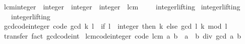 \begin{isabellebody}
%
\endisatagproof
{\isafoldproof}%
%
\isadelimproof
%
\endisadelimproof
\isanewline
\isanewline
{}\isamarkupfalse%
\ lcm{\isacharunderscore}{\kern0pt}integer\ {\isacharcolon}{\kern0pt}{\isacharcolon}{\kern0pt}\ {\isachardoublequoteopen}integer\ {\isasymRightarrow}\ integer\ {\isasymRightarrow}\ integer{\isachardoublequoteclose}\ \ lcm%
\isadelimproof
\ %
\endisadelimproof
%
\isatagproof
\isacommand{{\isachardot}{\kern0pt}}\isamarkupfalse%
%
\endisatagproof
{\isafoldproof}%
%
\isadelimproof
%
\endisadelimproof
\isanewline
\isanewline
{}\isamarkupfalse%
\isanewline
\isanewline
{}\isamarkupfalse%
%
\isadelimproof
\ %
\endisadelimproof
%
\isatagproof
\isacommand{{\isachardot}{\kern0pt}{\isachardot}{\kern0pt}}\isamarkupfalse%
%
\endisatagproof
{\isafoldproof}%
%
\isadelimproof
%
\endisadelimproof
\isanewline
\isanewline
{}\isamarkupfalse%
\isanewline
\isanewline
{}\isamarkupfalse%
\ integer{\isachardot}{\kern0pt}lifting\isanewline
{}\isamarkupfalse%
\ integer{\isachardot}{\kern0pt}lifting\isanewline
\isanewline
{}\isamarkupfalse%
\isanewline
\ \ \ integer{\isachardot}{\kern0pt}lifting\isanewline
{}\isanewline
\isanewline
{}\isamarkupfalse%
\ gcd{\isacharunderscore}{\kern0pt}code{\isacharunderscore}{\kern0pt}integer\ {\isacharbrackleft}{\kern0pt}code{\isacharbrackright}{\kern0pt}{\isacharcolon}{\kern0pt}\ {\isachardoublequoteopen}gcd\ k\ l\ {\isacharequal}{\kern0pt}\ {\isasymbar}if\ l\ {\isacharequal}{\kern0pt}\ {\isacharparenleft}{\kern0pt}{}{\isacharcolon}{\kern0pt}{\isacharcolon}{\kern0pt}integer{\isacharparenright}{\kern0pt}\ then\ k\ else\ gcd\ l\ {\isacharparenleft}{\kern0pt}{\isasymbar}k{\isasymbar}\ mod\ {\isasymbar}l{\isasymbar}{\isacharparenright}{\kern0pt}{\isasymbar}{\isachardoublequoteclose}\isanewline
%
\isadelimproof
\ \ %
\endisadelimproof
%
\isatagproof
{}\isamarkupfalse%
\ transfer\ {\isacharparenleft}{\kern0pt}fact\ gcd{\isacharunderscore}{\kern0pt}code{\isacharunderscore}{\kern0pt}int{\isacharparenright}{\kern0pt}%
\endisatagproof
{\isafoldproof}%
%
\isadelimproof
\isanewline
%
\endisadelimproof
\isanewline
{}\isamarkupfalse%
\ lcm{\isacharunderscore}{\kern0pt}code{\isacharunderscore}{\kern0pt}integer\ {\isacharbrackleft}{\kern0pt}code{\isacharbrackright}{\kern0pt}{\isacharcolon}{\kern0pt}\ {\isachardoublequoteopen}lcm\ a\ b\ {\isacharequal}{\kern0pt}\ {\isasymbar}a{\isasymbar}\ {\isacharasterisk}{\kern0pt}\ {\isasymbar}b{\isasymbar}\ div\ gcd\ a\ b{\isachardoublequoteclose}\isanewline

\end{isabellebody}
